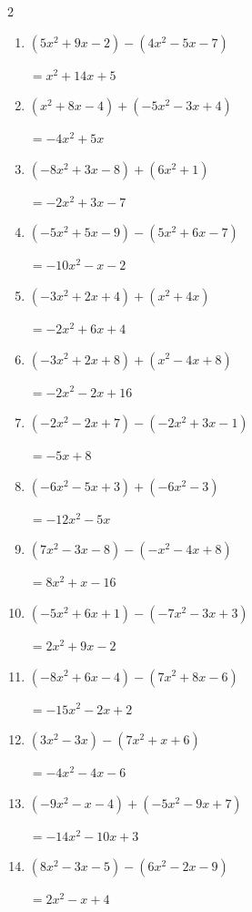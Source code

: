 \begin{multicols}{2}
\begin{enumerate}
  \item $(5x^{2}+9x-2)-(4x^{2}-5x-7)$

        $=x^{2}+14x+5$

  \item $(x^{2}+8x-4)+(-5x^{2}-3x+4)$

        $=-4x^{2}+5x$

  \item $(-8x^{2}+3x-8)+(6x^{2}+1)$

        $=-2x^{2}+3x-7$

  \item $(-5x^{2}+5x-9)-(5x^{2}+6x-7)$

        $=-10x^{2}-x-2$

  \item $(-3x^{2}+2x+4)+(x^{2}+4x)$

        $=-2x^{2}+6x+4$

  \item $(-3x^{2}+2x+8)+(x^{2}-4x+8)$

        $=-2x^{2}-2x+16$

  \item $(-2x^{2}-2x+7)-(-2x^{2}+3x-1)$

        $=-5x+8$

\columnbreak %

  \item $(-6x^{2}-5x+3)+(-6x^{2}-3)$

        $=-12x^{2}-5x$

  \item $(7x^{2}-3x-8)-(-x^{2}-4x+8)$

        $=8x^{2}+x-16$

  \item $(-5x^{2}+6x+1)-(-7x^{2}-3x+3)$

        $=2x^{2}+9x-2$

  \item $(-8x^{2}+6x-4)-(7x^{2}+8x-6)$

        $=-15x^{2}-2x+2$

  \item $(3x^{2}-3x)-(7x^{2}+x+6)$

        $=-4x^{2}-4x-6$

  \item $(-9x^{2}-x-4)+(-5x^{2}-9x+7)$

        $=-14x^{2}-10x+3$

  \item $(8x^{2}-3x-5)-(6x^{2}-2x-9)$

        $=2x^{2}-x+4$


\end{enumerate}
\end{multicols}
